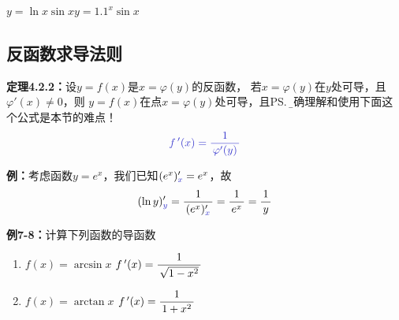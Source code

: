 \begin{center}
	\quad
	
	$y=\ln x\sin x$\hspace{5cm}$y=1.1^x\sin x$
\end{center}

\subsection{反函数求导法则}

{\bf 定理4.2.2：}设$y=f(x)$是$x=\varphi(y)$的反函数，
若$x=\varphi(y)$在$y$处可导，且$\varphi'(x)\ne 0$，则
$y=f(x)$在点$x=\varphi(y)$处可导，且\ps{\b 正确理解和使用下面这个公式是本节的难点！}
$${\b f\,'(x)=\df{1}{\varphi'(y)}}$$

{\bf 例：}考虑函数$y=e^x$，我们已知$(e^x)'_{\b x}=e^x$，故
$$(\ln y)'_{\b y}=\df1{(e^x)'_{\b x}}=\df1{e^x}=\df1y$$

{\bf 例7-8：}计算下列函数的导函数
\begin{enumerate}[(1)]
  \setlength{\itemindent}{1cm}
  \item $f(x)=\arcsin x$ \hfill $f\,'(x)=\displaystyle\frac{\,{1}\,}{\,{\sqrt{1-x^2}}\,}$ 
  \item $f(x)=\arctan x$ \hfill $f\,'(x)=\displaystyle\frac{\,{1}\,}{\,{1+x^2}\,}$
\end{enumerate}

